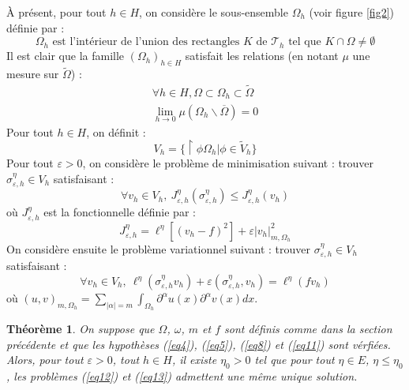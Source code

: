 \documentclass{article}
\newtheorem{theorem}{Théorème}[subsection]
\begin{document}
\bigskip
À présent, pour tout $h\in H$, on considère le sous-ensemble $\Omega_h$ (voir figure \ref{fig2}) définie par :
	\begin{equation} \label{eq8} \Omega_h \text{ est l'intérieur de l'union des rectangles } K \text{ de } \mathscr{T}_h \text{ tel que } K\cap\Omega\neq\emptyset \end{equation}
Il est clair que la famille $(\Omega_h)_{h\in H}$ satisfait les relations (en notant $\mu$ une mesure sur $\tilde{\Omega}$) :
\begin{eqnarray}
	\label{eq9} \forall h\in H, \Omega\subset\Omega_h\subset\tilde{\Omega}\\
	\label{eq10} \lim_{h\to 0} \mu(\Omega_h\backslash\overline{\Omega})=0
\end{eqnarray}
Pour tout $h\in H$, on définit :
	\begin{equation}\label{eq11} V_h=\{\restriction{\phi}{\Omega_h}| \phi\in\tilde{V}_h\}\end{equation}
Pour tout $\varepsilon>0$, on considère le problème de minimisation suivant : trouver $\sigma_{\varepsilon,h}^\eta\in V_h$ satisfaisant :
	\begin{equation} \label{eq12} \forall v_h\in V_h,\ J_{\varepsilon, h}^\eta (\sigma_{\varepsilon, h}^\eta)\leq J_{\varepsilon, h}^\eta (v_h) \end{equation}
où $J_{\varepsilon, h}^\eta$ est la fonctionnelle définie par :
	\[J_{\varepsilon, h}^\eta=\ell^\eta \left[(v_h-f)^2\right]+\varepsilon |v_h|^2_{m,\Omega_h}\]
On considère ensuite le problème variationnel suivant : trouver $\sigma_{\varepsilon,h}^\eta\in V_h$ satisfaisant :
	\begin{equation} \label{eq13} \forall v_h\in V_h,\ \ell^\eta (\sigma_{\varepsilon, h}^\eta v_h)+ \varepsilon \left(\sigma_{\varepsilon, h}^\eta,v_h\right)=\ell^\eta(fv_h) \end{equation}
où $(u,v)_{m,\Omega_h}=\sum_{|\alpha|=m} \int_{\Omega_h} \partial^\alpha u(x) \partial^\alpha v(x) dx$.\\

\begin{theorem}
On suppose que $\Omega$, $\omega$, $m$ et $f$ sont définis comme dans la section précédente et que les hypothèses (\ref{eq4}), (\ref{eq5}), (\ref{eq8}) et (\ref{eq11}) sont vérfiées. Alors, pour tout $\varepsilon>0$, tout $h\in H$, il existe $\eta_0>0$ tel que pour tout $\eta\in E$, $\eta\leq\eta_0$, les problèmes (\ref{eq12}) et (\ref{eq13}) admettent une même unique solution.
\end{theorem}



\end{document}
